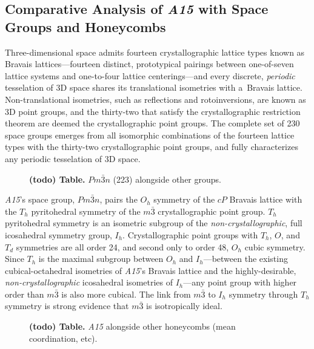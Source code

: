 \documentclass[10pt]{article}
\def\AAAB{\textit{A15}}
\begin{document}
\subsection{Comparative Analysis of \AAAB{} with Space Groups and Honeycombs}\label{comparative-analysis-of-a15-with-space-groups-and-honeycombs}

Three-dimensional space admits fourteen crystallographic lattice types known as Bravais lattices---fourteen distinct,
prototypical pairings between one-of-seven lattice systems and one-to-four lattice centerings---and every discrete,
\emph{periodic} tesselation of 3D space shares its translational isometries with a~Bravais lattice. Non-translational isometries,
such as reflections and rotoinversions, are known as 3D point groups, and the thirty-two that satisfy the crystallographic
restriction theorem are deemed the crystallographic point groups. The complete set of 230 space groups emerges from all
isomorphic combinations of the fourteen lattice types with the thirty-two crystallographic point groups, and fully characterizes
any periodic tesselation of 3D space.

\begin{figure}[!ht]\textbf{(todo) Table.} $Pm\bar{3}n$ (223) alongside other groups.\end{figure}

\AAAB{}'s space group, $Pm\bar{3}n$, pairs the $O_h$ symmetry of the $cP$ Bravais lattice with the $T_h$ pyritohedral symmetry of
the $m\bar{3}$ crystallographic point group. $T_h$ pyritohedral symmetry is an isometric subgroup of the
\emph{non-crystallographic}, full icosahedral symmetry group, $I_h$. Crystallographic point groups with $T_h$, $O$, and $T_d$
symmetries are all order 24, and second only to order 48, $O_h$ cubic symmetry. Since $T_h$ is the maximal subgroup between $O_h$
and $I_h$---between the existing cubical-octahedral isometries of \AAAB{}'s Bravais lattice and the highly-desirable,
\emph{non-crystallographic} icosahedral isometries of $I_h$---any point group with higher order than $m\bar{3}$ is also more
cubical. The link from $m\bar{3}$ to $I_h$ symmetry through $T_h$ symmetry is strong evidence that $m\bar{3}$ is isotropically
ideal.

\begin{figure}[!ht]\textbf{(todo) Table.} \AAAB{} alongside other honeycombs (mean coordination, etc).\end{figure}
\end{document}
